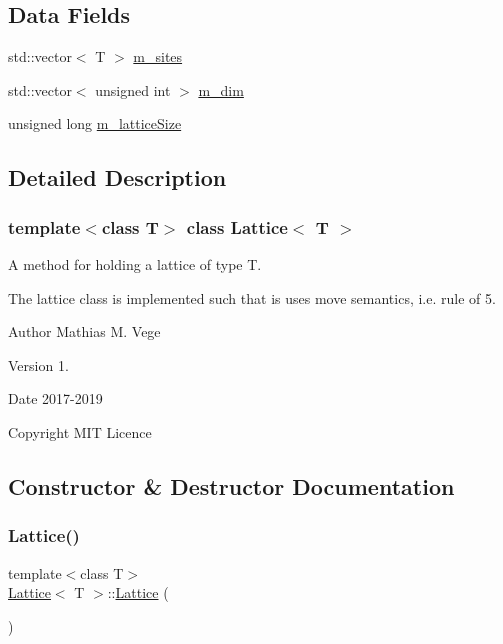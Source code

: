 \subsection*{Data Fields}
\begin{DoxyCompactItemize}
\item 
std\+::vector$<$ T $>$ \mbox{\hyperlink{class_lattice_a605a93a5b2a973811f7cff44a8ab84f7}{m\+\_\+sites}}
\item 
std\+::vector$<$ unsigned int $>$ \mbox{\hyperlink{class_lattice_a6adf73dcd2ef1663d7d38b192f7fd91e}{m\+\_\+dim}}
\item 
unsigned long \mbox{\hyperlink{class_lattice_a933045fb4a76f62d29472e6061ed8a34}{m\+\_\+lattice\+Size}}
\end{DoxyCompactItemize}


\subsection{Detailed Description}
\subsubsection*{template$<$class T$>$\newline
class Lattice$<$ T $>$}

A method for holding a lattice of type T. 

The lattice class is implemented such that is uses move semantics, i.\+e. rule of 5.

\begin{DoxyAuthor}{Author}
Mathias M. Vege 
\end{DoxyAuthor}
\begin{DoxyVersion}{Version}
1. 
\end{DoxyVersion}
\begin{DoxyDate}{Date}
2017-\/2019 
\end{DoxyDate}
\begin{DoxyCopyright}{Copyright}
M\+IT Licence 
\end{DoxyCopyright}


\subsection{Constructor \& Destructor Documentation}
\mbox{\label{class_lattice_ac32e6300cc5ebc246a060cd67d99f370}} 
\subsubsection{\texorpdfstring{Lattice()}{Lattice()}\hspace{0.1cm}{\footnotesize\ttfamily [1/4]}}
{\footnotesize\ttfamily template$<$class T$>$ \\
\mbox{\hyperlink{class_lattice}{Lattice}}$<$ T $>$\+::\mbox{\hyperlink{class_lattice}{Lattice}} (\begin{DoxyParamCaption}{ }\end{DoxyParamCaption})\hspace{0.3cm}{\ttfamily [inline]}}

